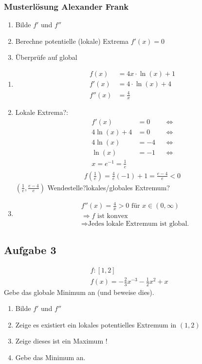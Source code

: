 \subsubsection{Musterlösung Alexander Frank}
\begin{enumerate}[label=\alph*)]
    \item Bilde $f'$ und $f''$
    \item Berechne potentielle (lokale) Extrema $f'(x) = 0$
    \item Überprüfe auf global
\end{enumerate}

\begin{enumerate}[label=\alph*)]
    \item \begin{align*}
        f(x) &= 4x \cdot \ln(x) + 1\\
        f'(x) &= 4 \cdot \ln (x) + 4\\
        f''(x) &= \frac{4}{x}
    \end{align*}
    \item Lokale Extrema?:
    \begin{align*}
        f'(x) &= 0 &&\Leftrightarrow\\ 
        4\ln(x) + 4 &= 0 && \Leftrightarrow \\
        4 \ln(x) &= -4 &&\Leftrightarrow \\
        \ln(x) &= - 1 && \Leftrightarrow \\
        x = e^{-1} = \frac{1}{e}
    \end{align*}
    \begin{align*}
        f(\frac{1}{e}) = \frac{4}{e} (-1) + 1 = \frac{e - 4}{e} < 0
    \end{align*}
    $(\frac{1}{e}, \frac{e - 4}{e})$ Wendestelle?lokales/globales Extremum?
    \item \begin{align*}
        &f''(x) = \frac{4}{x} > 0 \text{ für } x \in (0, \infty)\\
        &\Rightarrow f \text{ ist konvex}\\
        &\Rightarrow \text{Jedes lokale Extremum ist global.}
    \end{align*}
\end{enumerate}

\subsection{Aufgabe 3}
\begin{align*}
    &f: [1, 2]\\
    &f(x) = - \frac{2}{3}x^{-3} - \frac{1}{2} x^2 + x
\end{align*}
Gebe das globale Minimum an (und beweise dies).
\begin{enumerate}[label = \alph*)]
    \item Bilde $f'$ und $f''$
    \item Zeige es existiert ein lokales potentielles Extremum in $(1, 2)$
    \item Zeige dieses ist ein Maximum !
    \item Gebe das Minimum an.
\end{enumerate}

